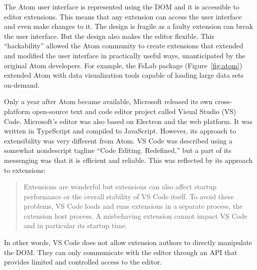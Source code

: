 The Atom user interface is represented using the DOM and it is accessible to editor extensions.
This means that any extension can access the user interface and even make changes to it.
The design is fragile as a faulty extension can break the user interface. But the design also
makes the editor flexible. This ``hackability'' allowed the Atom community
to create extensions that extended and modified the user interface in practically useful
ways, unanticipated by the original Atom developers. For example, the FsLab package
(Figure~\ref{fig:atom}) extended Atom with data visualization tools capable of loading
large data sets on-demand.

Only a year after Atom became available, Microsoft released its own cross-platform open-source text
and code editor project called Visual Studio (VS) Code. Microsoft's editor was also based on
Electron and the web platform. It was written in TypeScript and compiled to JavaScript.
However, its approach to extensibility was very different
from Atom. VS Code was described using a somewhat nondescript tagline ``Code Editing.
Redefined,''
but a part of its messenging was that it is efficient and reliable.
This was reflected by its approach to extensions:

\begin{quote}
Extensions are wonderful but extensions can also affect startup performance or the overall
stability of VS Code itself. To avoid these problems, VS Code loads and runs extensions in
a separate process, the extension host process. A misbehaving extension cannot impact VS Code
and in particular its startup time.
\end{quote}

In other words, VS Code does not allow extension authors to directly manipulate the DOM.
They can only communicate with the editor through an API that provides limited and controlled
access to the editor.

